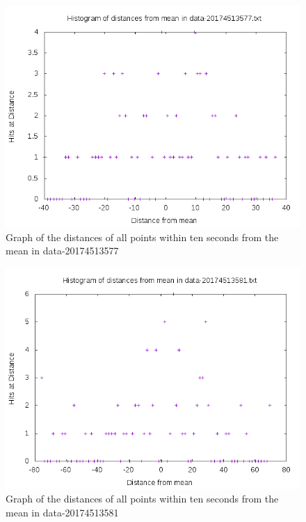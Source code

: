 \documentclass[10pt,letterpaper]{article}
\begin{document}
\begin{figure}[h]
\centering
\includegraphics[scale=0.5]{data-20174513577.png}
\caption{\label{fig:data-20174513577.png}Graph of the distances of all points within ten seconds from the mean in data-20174513577}
\end{figure}
\begin{figure}[h]
\centering
\includegraphics[scale=0.5]{data-20174513581.png}
\caption{\label{fig:data-20174513581.png}Graph of the distances of all points within ten seconds from the mean in data-20174513581}
\end{figure}
\end{document}
